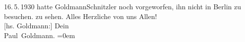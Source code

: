 \begin{ledgroupsized}[t]{13cm}
{{{                     16. 5. 1930 hatte
                     GoldmannSchnitzler noch vorgeworfen, ihn nicht in
                     Berlin zu besuchen.}}}\label{K_L03516-2h} zu sehen.\pend
           \pstart
           Alles Herzliche von uns Allen! {\\[\baselineskip]}{[}hs. Goldmann:{]} Dein {\\[\baselineskip]}\spacefill\mbox{Paul Goldmann.}\pend
           \leftskip=0em{}
         
         \endnumbering{}\end{ledgroupsized}\begin{anhang}\end{anhang}\newcommand{\dateiname}{L03516}\newcommand{\titel}{Paul Goldmann an Arthur Schnitzler, 3. 5. 1928}\newcommand{\editorInnen}{Martin Anton Müller und Laura Untner}
      